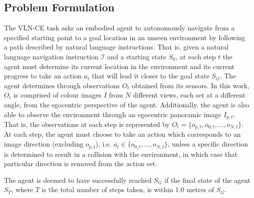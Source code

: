 \documentclass{svproc}
\begin{document}
\subsection{Problem Formulation}
    The VLN-CE task asks an embodied agent to autonomously navigate from a specified starting point to a goal location in an unseen environment by following a path described by natural language instructions. That is, given a natural language navigation instruction $\mathcal{I}$ and a starting state $S_0$, at each step $t$ the agent must determine its current location in the environment and its current progress to take an action $a_t$ that will lead it closer to the goal state $S_G$. The agent determines through observations $O_t$ obtained from its sensors. In this work, $O_t$ is comprised of colour images $I$ from $N$ different views, each set at a different angle, from the egocentric perspective of the agent. Additionally, the agent is also able to observe the environment through an egocentric panoramic image $I_{p,t}$. That is, the observations at each step is represented by $O_t = \{o_{p,t}, o_{0, t}, ..., o_{N,t}\}$. At each step, the agent must choose to take an action which corresponds to an image direction (excluding $o_{p,t}$), i.e. $a_t \in \{o_{0,t}, ..., o_{N,t}\}$, unless a specific direction is determined to result in a collision with the environment, in which case that particular direction is removed from the action set.

    The agent is deemed to have successfully reached $S_G$ if the final state of the agent $S_T$, where $T$ is the total number of steps taken, is within 1.0 metres of $S_G$.
\end{document}
